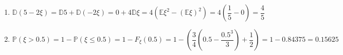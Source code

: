 \begin{solution}
\begin{enumerate}[label=\alph*)]
        \item \(\mathbb{D}(5 - 2\xi) = \mathbb{D}5 + \mathbb{D}(-2\xi) = 0 + 4\mathbb{D}\xi = 4 \left( \mathbb{E}\xi^2 - \left( \mathbb{E}\xi \right)^2 \right) = 4 \left( \dfrac{1}{5} - 0 \right) = \dfrac{4}{5}\)
        \item \( \mathbb{P} (\xi > 0.5) = 1 - \mathbb{P}(\xi \leqslant 0.5) = 1 - F_\xi(0.5) = 1 - \left( \dfrac{3}{4} \left( 0.5 - \dfrac{0.5^3}{3} \right) + \dfrac{1}{2} \right) = 1 - 0.84375 = 0.15625\)
    \end{enumerate}
\end{solution}